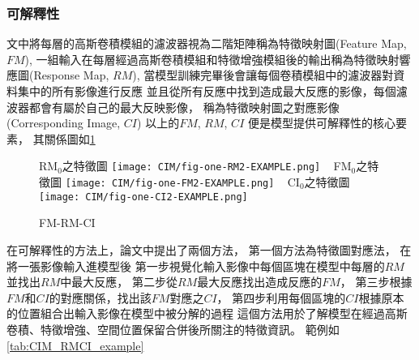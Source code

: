 \documentclass[class=NCU_thesis, crop=false]{standalone}
\begin{document}
\subsubsection{可解釋性}
文中將每層的高斯卷積模組的濾波器視為二階矩陣稱為特徵映射圖(Feature Map, $FM$),
一組輸入在每層經過高斯卷積模組和特徵增強模組後的輸出稱為特徵映射響應圖(Response Map, $RM$),
當模型訓練完畢後會讓每個卷積模組中的濾波器對資料集中的所有影像進行反應
並且從所有反應中找到造成最大反應的影像，每個濾波器都會有屬於自己的最大反映影像，
稱為特徵映射圖之對應影像(Corresponding Image, $CI$)
以上的$FM$, $RM$, $CI$ 便是模型提供可解釋性的核心要素，
其關係圖如\cref{fig:one-FM2-RM2-CI2-EXAMPLE}

\begin{figure}[H]
    \centering
    \subcaptionbox
        {RM$_{0}$之特徵圖
        \label{fig:one-RM2-EXAMPLE}}
        {\texttt{[image: CIM/fig-one-RM2-EXAMPLE.png]}}
    ~
    \subcaptionbox
        {FM$_{0}$之特徵圖
        \label{fig:one-FM2-EXAMPLE}}
        {\texttt{[image: CIM/fig-one-FM2-EXAMPLE.png]}}
    ~
    \subcaptionbox
        {CI$_{0}$之特徵圖
        \label{fig:one-CI2-EXAMPLE}}
        {\texttt{[image: CIM/fig-one-CI2-EXAMPLE.png]}}
    \caption{FM-RM-CI\cite{YangCNNInterpretable}}
    \label{fig:one-FM2-RM2-CI2-EXAMPLE}
\end{figure}

在可解釋性的方法上，論文中提出了兩個方法，
第一個方法為特徵圖對應法，
在將一張影像輸入進模型後
第一步視覺化輸入影像中每個區塊在模型中每層的$RM$並找出$RM$中最大反應，
第二步從$RM$最大反應找出造成反應的$FM$，
第三步根據$FM$和$CI$的對應關係，找出該$FM$對應之$CI$，
第四步利用每個區塊的$CI$根據原本的位置組合出輸入影像在模型中被分解的過程
這個方法用於了解模型在經過高斯卷積、特徵增強、空間位置保留合併後所關注的特徵資訊。
範例如\cref{tab:CIM_RMCI_example}
\end{document}
